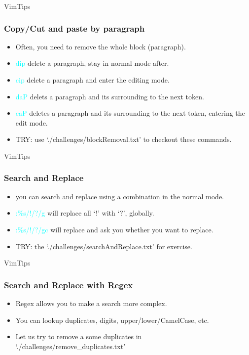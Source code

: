 \documentclass{beamer}
\newcommand{\highlight}[1]{\textcolor{cyan}{\textsf{#1}}}
\begin{document}
\begin{frame}{VimTips}
    \frametitle{Copy/Cut and paste by paragraph}
    \begin{itemize}
        \item Often, you need to remove the whole block (paragraph).
        \item \highlight{dip} delete a \textsf{p}aragraph, stay in normal mode after.
        \item \highlight{cip} delete a \textsf{p}aragraph and enter the editing mode.
        \item \highlight{daP} delets a \textsf{p}aragraph and its surrounding to the next token.
        \item \highlight{caP} deletes a \textsf{p}aragraph and its surrounding to the next token, entering the edit mode.
        \item TRY: use `./challenges/blockRemoval.txt' to checkout these commands.
    \end{itemize}
\end{frame}

\begin{frame}{VimTips}
    \frametitle{Search and Replace}
    \begin{itemize}
        \item you can search and replace using a combination in the normal mode.
        \item \highlight{:\%s/!/?/g} will replace all `!' with `?', globally.
        \item \highlight{:\%s/!/?/gc} will replace and ask you whether you want to replace.
        \item TRY: the `./challenges/searchAndReplace.txt' for exercise.
    \end{itemize}
\end{frame}

\begin{frame}{VimTips}
    \frametitle{Search and Replace with Regex}
    \begin{itemize}
        \item Regex allows you to make a search more complex.
        \item You can lookup duplicates, digits, upper/lower/CamelCase, etc.
        \item Let us try to remove a some duplicates in `./challenges/remove\_duplicates.txt'
    \end{itemize}
\end{frame}
\end{document}
